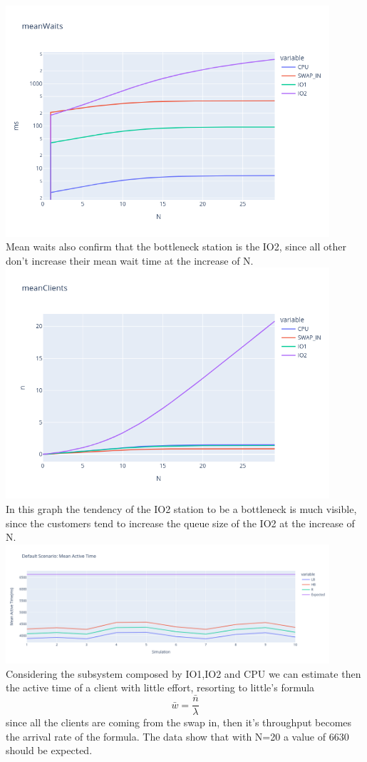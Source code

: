 \documentclass[12pt,a4paper]{article}
\begin{document}
\\
\includegraphics[width=0.9\textwidth]{Images/meanWaits.png}
\\
Mean waits also confirm that the bottleneck station is the IO2, since all other don't increase their mean wait time at the increase of N.
\\
\includegraphics[width=0.9\textwidth]{Images/meanClients.png}
\\
In this graph the tendency of the IO2 station to be a bottleneck is much visible, since the customers tend to increase the queue size of the IO2 at the increase of N.
\\
\includegraphics[width=0.9\textwidth]{Images/ActiveTimes.png}
\\
Considering the subsystem composed by IO1,IO2 and CPU we can estimate then the active time of a client with little effort, resorting to little's formula
$$
    \bar{w}= \frac{\bar{n}}{\lambda}
$$
since all the clients are coming from the swap in, then it's throughput becomes the arrival rate of the formula. The data show that with N=20 a value of 6630 should be expected.
\end{document}
